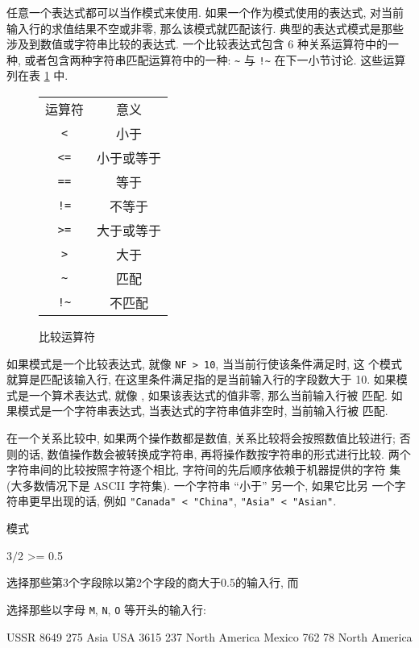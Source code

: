 任意一个表达式都可以当作模式来使用. 如果一个作为模式使用的表达式, 对当前
输入行的求值结果不空或非零, 那么该模式就匹配该行. 典型的表达式模式是那些
涉及到数值或字符串比较的表达式. 一个比较表达式包含 6 种关系运算符中的一种,
或者包含两种字符串匹配运算符中的一种: \verb'~' 与 \verb'!~' 在下一小节讨论.
这些运算列在表 \ref{tbl:comparison_operators} 中.
\begin{figure}[ht]
\caption{比较运算符}
\label{tbl:comparison_operators}
\begin{tabular}{c|c}
    \hline
    \hline
    运算符      & 意义 \\
    \verb'<'    & 小于 \\
    \verb'<='   & 小于或等于 \\
    \verb'=='   & 等于  \\
    \verb'!='   & 不等于 \\
    \verb'>='   & 大于或等于 \\
    \verb'>'    & 大于  \\
    \verb'~'    & 匹配 \\
    \verb'!~'   & 不匹配
\end{tabular}
\end{figure}

如果模式是一个比较表达式, 就像 \verb'NF > 10', 当当前行使该条件满足时, 这
个模式就算是匹配该输入行, 在这里条件满足指的是当前输入行的字段数大于 10.
如果模式是一个算术表达式, 就像 \nf, 如果该表达式的值非零, 那么当前输入行被
匹配. 如果模式是一个字符串表达式, 当表达式的字符串值非空时, 当前输入行被
匹配.

在一个关系比较中, 如果两个操作数都是数值, 关系比较将会按照数值比较进行;
否则的话, 数值操作数会被转换成字符串, 再将操作数按字符串的形式进行比较.
两个字符串间的比较按照字符逐个相比, 字符间的先后顺序依赖于机器提供的字符
集 (大多数情况下是 ASCII 字符集). 一个字符串 ``小于'' 另一个, 如果它比另
一个字符串更早出现的话, 例如 \verb'"Canada" < "China"',
\verb'"Asia" < "Asian"'.

模式
\begin{awkcode}
    $3/$2 >= 0.5
\end{awkcode}
选择那些第3个字段除以第2个字段的商大于0.5的输入行, 而
选择那些以字母 \verb'M', \verb'N', \verb'O' 等开头的输入行:
\begin{file}
    USSR	8649	275	Asia
    USA	3615	237	North America
    Mexico	762	78	North America
\end{file}

